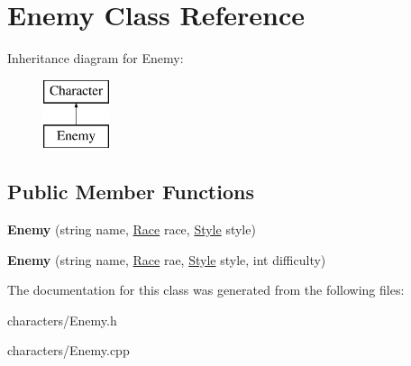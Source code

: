 \hypertarget{class_enemy}{}\section{Enemy Class Reference}
\label{class_enemy}
Inheritance diagram for Enemy\+:\begin{figure}[H]
\begin{center}
\leavevmode
\includegraphics[height=2.000000cm]{class_enemy}
\end{center}
\end{figure}
\subsection*{Public Member Functions}
\begin{DoxyCompactItemize}
\item 
\mbox{\label{class_enemy_a259fe54d9fcfc4cae6e482793baafb82}} 
{\bfseries Enemy} (string name, \mbox{\hyperlink{class_race}{Race}} race, \mbox{\hyperlink{class_style}{Style}} style)
\item 
\mbox{\label{class_enemy_af3a039ff10ec66a80e76bde51474c2dc}} 
{\bfseries Enemy} (string name, \mbox{\hyperlink{class_race}{Race}} rae, \mbox{\hyperlink{class_style}{Style}} style, int difficulty)
\end{DoxyCompactItemize}


The documentation for this class was generated from the following files\+:\begin{DoxyCompactItemize}
\item 
characters/Enemy.\+h\item 
characters/Enemy.\+cpp\end{DoxyCompactItemize}
